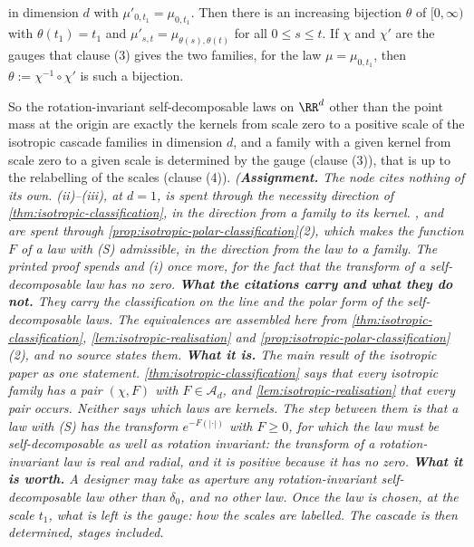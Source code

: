 \begin{theorem}
\begin{enumerate}
in dimension $d$ with $\mu'_{0,t_1} = \mu_{0,t_1}$. Then there is an increasing bijection
$\theta$ of $[0,\infty)$ with $\theta(t_1) = t_1$ and
$\mu'_{s,t} = \mu_{\theta(s),\theta(t)}$ for all $0 \le s \le t$. If $\chi$ and $\chi'$ are the
gauges that clause (3) gives the two families, for the law $\mu = \mu_{0,t_1}$, then
$\theta := \chi^{-1} \circ \chi'$ is such a bijection.
\end{enumerate}
So the rotation-invariant self-decomposable laws on $\RR^d$ other than the point mass at the
origin are exactly the kernels from scale zero to a positive scale of the isotropic cascade
families in dimension $d$, and a family with a given kernel from scale zero to a given scale is
determined by the gauge (clause (3)), that is up to the relabelling of the scales (clause (4)).
\statusA\quad{}\quad{}\quad{}\quad\emph{(\textbf{Assignment.} The node
cites nothing of its own. (ii)--(iii), at $d = 1$, is spent through the necessity
direction of \ref{thm:isotropic-classification}, in the direction from a family to its kernel.
,  and  are spent through
\ref{prop:isotropic-polar-classification}(2), which makes the function $F$ of a law with (S)
admissible, in the direction from the law to a family. The printed proof spends  and
(i) once more, for the fact that the transform of a self-decomposable law has no zero.
\textbf{What the citations carry and what they do not.} They carry the classification on the
line and the polar form of the self-decomposable laws. The equivalences are assembled here from
\ref{thm:isotropic-classification}, \ref{lem:isotropic-realisation} and
\ref{prop:isotropic-polar-classification}(2), and no source states them. \textbf{What it is.}
The main result of the isotropic paper as one statement. \ref{thm:isotropic-classification} says
that every isotropic family has a pair $(\chi, F)$ with $F \in \mathcal{A}_d$, and
\ref{lem:isotropic-realisation} that every pair occurs. Neither says which laws are kernels.
The step between them is that a law with (S) has the transform $e^{-F(|\cdot|)}$ with $F \ge 0$,
for which the law must be self-decomposable as well as rotation invariant: the transform of a
rotation-invariant law is real and radial, and it is positive because it has no zero.
\textbf{What it is worth.} A designer may take as aperture any rotation-invariant
self-decomposable law other than $\delta_0$, and no other law. Once the law is chosen, at the scale $t_1$, what is left
is the gauge: how the scales are labelled. The cascade is then determined, stages included.
}
\end{theorem}
